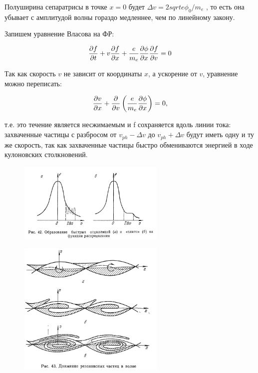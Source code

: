 \documentclass[10pt, a4paper]{article}
\begin{document}
Полуширина сепаратрисы в точке $x=0$ будет $\Delta v=2 sqrt{e \phi_0 / m_e}$ , то есть она убывает с амплитудой волны гораздо медленнее, чем по линейному закону.
 
Запишем уравнение Власова на ФР:

\begin{equation*}
	\pdv{f}{t} + v \pdv{f}{x} + \frac{e}{m_e} \pdv{\phi}{x} \pdv{f}{v} =0 
\end{equation*}

Так как скорость $v$ не зависит от координаты $x$, а ускорение от $v$, уравнение можно переписать:

\begin{equation*}
	\pdv{v}{x} +\pdv{}{v} \left(\frac{e}{m_e} \pdv{\phi}{x}\right)=0,
\end{equation*}

т.е. это течение является несжимаемым и f сохраняется вдоль линии тока: захваченные частицы с разбросом от $v_{ph}-\Delta v$ до $v_{ph}+\Delta v$ будут иметь одну и ту же скорость, так как захваченные частицы быстро обмениваются энергией в ходе кулоновских столкновений.

\begin{figure}[ht]
	\begin{center}
		\includegraphics[width=70mm]{zatuh_landau_nonlinear_2.JPG}
	\end{center}
\end{figure}

\begin{figure}[ht]
	\begin{center}
		\includegraphics[width=70mm]{zatuh_landau_nonlinear_3.JPG}
	\end{center}
\end{figure}
\end{document}

